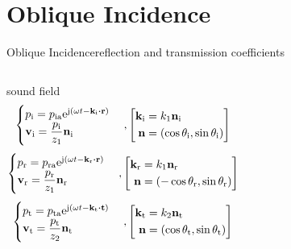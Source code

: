 \documentclass[9pt,mathserif]{beamer}
\begin{document}
\section{Oblique Incidence}

\begin{frame}{Oblique Incidence}{reflection and transmission coefficients}
	\begin{columns}
		\begin{outline}
			\1 sound field
			$$\begin{cases}p\st{i} = p\st{ia} \me^{\mj (\omega t-\vb{k}\st{i}
				\vdot \vb{r})} \\ \vb{v}\st{i} = \dfrac{p\st{i}}{z_1}\vb{n}\st{i}\end{cases}
			, \qty[\begin{split}\vb{k}\st{i} &= k_1\vb{n}\st{i}\\ \vb{n} &=
				(\cos \theta\st{i}, \sin\theta\st{i})\end{split}]$$
			$$\begin{cases}p\st{r} = p\st{ra} \me^{\mj (\omega t-\vb{k}\st{r}
				\vdot \vb{r})} \\ \vb{v}\st{r} = \dfrac{p\st{r}}{z_1}\vb{n}\st{r}\end{cases}
			, \qty[\begin{split}\vb{k}\st{r} &= k_1\vb{n}\st{r}\\ \vb{n} &=
				(-\cos \theta\st{r}, \sin\theta\st{r})\end{split}]$$
			$$\begin{cases}p\st{t} = p\st{ta} \me^{\mj (\omega t-\vb{k}\st{t}
				\vdot \vb{t})} \\ \vb{v}\st{t} = \dfrac{p\st{t}}{z_2}\vb{n}\st{t}\end{cases}
			, \qty[\begin{split}\vb{k}\st{t} &= k_2\vb{n}\st{t}\\ \vb{n} &=
				(\cos \theta\st{t}, \sin\theta\st{t})\end{split}]$$
		\end{outline}
		\begin{figure}
			\centering

\end{figure}
\end{columns}
\end{frame}
\end{document}
